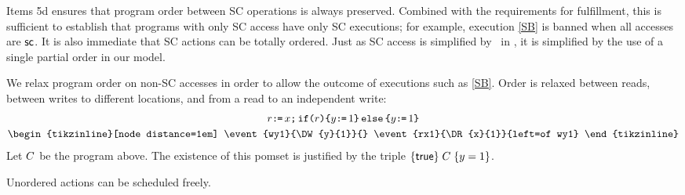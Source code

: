 Items 5d ensures that program order between SC operations is always
preserved.  Combined with the requirements for fulfillment, this is
sufficient to establish that programs with only SC access have only SC
executions; for example, execution \eqref{SB} is banned when all accesses are
${\mathsf{sc}}$.  It is also immediate that SC actions can be totally ordered.
Just as SC access is simplified by \mca\ in \armeight, it is simplified by
the use of a single partial order in our model.

We relax program order on non-SC accesses in order to allow the outcome
of executions such as \eqref{SB}.
Order is relaxed between reads, between writes to different
locations, and from a read to an independent write:
\begin{gather*}
  \aReg\GETS x\SEMI \IF{\aReg}\THEN y\GETS1 \ELSE y\GETS1\FI
  \\
  \hbox{\begin{tikzinline}[node distance=1em]
      \event{wy1}{\DW{y}{1}}{}
      \event{rx1}{\DR{x}{1}}{left=of wy1}
    \end{tikzinline}}
\end{gather*}
Let $C$ be the program above.  The existence of this pomset is justified
by the triple
$\{\mathsf{true}\}\allowbreak\;C\;\allowbreak\{y=1\}$.

Unordered actions can be scheduled freely.



